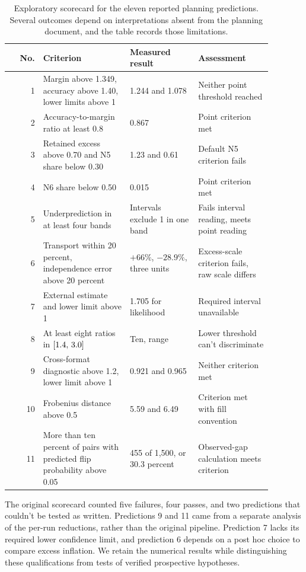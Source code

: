 \begin{table}[!htb]
\centering
\caption{Exploratory scorecard for the eleven reported planning predictions. Several outcomes depend on interpretations absent from the planning document, and the table records those limitations.}
\label{tab:original6}
\small\setlength{\tabcolsep}{4pt}\renewcommand{\arraystretch}{1.12}
\begin{tabular}{rL{0.33\linewidth}L{0.26\linewidth}L{0.29\linewidth}}\toprule
No. & Criterion & Measured result & Assessment\\ & Margin above 1.349, accuracy above 1.40, lower limits above 1 & 1.244 and 1.078 & Neither point threshold reached\\
2 & Accuracy-to-margin ratio at least 0.8 & 0.867 & Point criterion met\\
3 & Retained excess above 0.70 and N5 share below 0.30 & 1.23 and 0.61 & Default N5 criterion fails\\
4 & N6 share below 0.50 & 0.015 & Point criterion met\\
5 & Underprediction in at least four bands & Intervals exclude 1 in one band & Fails interval reading, meets point reading\\
6 & Transport within 20 percent, independence error above 20 percent & $+66\%$, $-28.9\%$, three units & Excess-scale criterion fails, raw scale differs\\
7 & External estimate and lower limit above 1 & 1.705 for likelihood & Required interval unavailable\\
8 & At least eight ratios in $[1.4,\,3.0]$ & Ten, range  & Lower threshold can't discriminate\\
9 & Cross-format diagnostic above 1.2, lower limit above 1 & 0.921 and 0.965 & Neither criterion met\\
10 & Frobenius distance above 0.5 & 5.59 and 6.49 & Criterion met with fill convention\\
11 & More than ten percent of pairs with predicted flip probability above 0.05 & 455 of 1,500, or 30.3 percent & Observed-gap calculation meets criterion\\\bottomrule
\end{tabular}
\end{table}

The original scorecard counted five failures, four passes, and two predictions that couldn't be tested as written. Predictions 9 and 11 came from a separate analysis of the per-run reductions, rather than the original pipeline. Prediction 7 lacks its required lower confidence limit, and prediction 6 depends on a post hoc choice to compare excess inflation. We retain the numerical results while distinguishing these qualifications from tests of verified prospective hypotheses.

